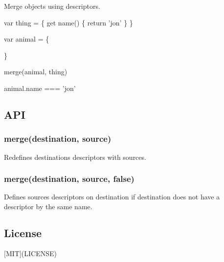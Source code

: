 \href{https://npmjs.org/package/merge-descriptors}{\tt } \href{https://npmjs.org/package/merge-descriptors}{\tt } \href{https://travis-ci.org/component/merge-descriptors}{\tt } \href{https://coveralls.io/r/component/merge-descriptors?branch=master}{\tt }

Merge objects using descriptors.


\begin{DoxyCode}
var thing = \{
  get name() \{
    return 'jon'
  \}
\}

var animal = \{

\}

merge(animal, thing)

animal.name === 'jon'
\end{DoxyCode}


\subsection*{A\+PI}

\subsubsection*{merge(destination, source)}

Redefines {\ttfamily destination}\textquotesingle{}s descriptors with {\ttfamily source}\textquotesingle{}s.

\subsubsection*{merge(destination, source, false)}

Defines {\ttfamily source}\textquotesingle{}s descriptors on {\ttfamily destination} if {\ttfamily destination} does not have a descriptor by the same name.

\subsection*{License}

\mbox{[}M\+IT\mbox{]}(L\+I\+C\+E\+N\+SE) 